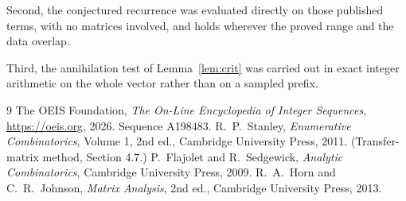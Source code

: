 \documentclass[11pt,a4paper]{article}
\theoremstyle{plain}
\theoremstyle{definition}
\begin{document}
Second, the conjectured recurrence was evaluated directly on those published terms, with no
matrices involved, and holds wherever the proved range and the data overlap.

Third, the annihilation test of Lemma~\ref{lem:crit} was carried out in exact integer
arithmetic on the whole vector rather than on a sampled prefix.

\begin{thebibliography}{9}
 The OEIS Foundation, \emph{The On-Line Encyclopedia of Integer
Sequences}, \url{https://oeis.org}, 2026. Sequence A198483.
 R.~P.~Stanley, \emph{Enumerative Combinatorics}, Volume 1, 2nd ed.,
Cambridge University Press, 2011. (Transfer-matrix method, Section 4.7.)
 P.~Flajolet and R.~Sedgewick, \emph{Analytic Combinatorics}, Cambridge
University Press, 2009.
 R.~A.~Horn and C.~R.~Johnson, \emph{Matrix Analysis}, 2nd ed., Cambridge
University Press, 2013.
\end{thebibliography}
\end{document}
